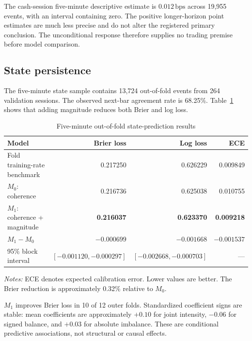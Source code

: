 \documentclass[11pt]{article}
\newcommand{\Mzero}{M_{0}}
\newcommand{\Mone}{M_{1}}
\newcommand{\bps}{\mathrm{bps}}
\begin{document}
The cash-session five-minute descriptive estimate is $0.012\,\bps$ across 19,955 events,
with an interval containing zero. The positive longer-horizon point estimates are much
less precise and do not alter the registered primary conclusion. The unconditional
response therefore supplies no trading premise before model comparison.

\subsection{State persistence}

The five-minute state sample contains 13,724 out-of-fold events from 264 validation
sessions. The observed next-bar agreement rate is 68.25\%. Table~\ref{tab:state-results}
shows that adding magnitude reduces both Brier and log loss.

\begin{table}[!htbp]
  \centering
  \caption{Five-minute out-of-fold state-prediction results}
  \label{tab:state-results}
  \small
  \begin{tabular}{lrrr}
    \toprule
    Model & Brier loss & Log loss & ECE \\
    \midrule
    Fold training-rate benchmark & 0.217250 & 0.626229 & 0.009849 \\
    $\Mzero$: coherence & 0.216736 & 0.625038 & 0.010755 \\
    $\Mone$: coherence + magnitude & \textbf{0.216037} & \textbf{0.623370} & \textbf{0.009218} \\
    \midrule
    $\Mone-\Mzero$ & $-0.000699$ & $-0.001668$ & $-0.001537$ \\
    95\% block interval & $[-0.001120,-0.000297]$ & $[-0.002668,-0.000703]$ & --- \\
    \bottomrule
  \end{tabular}
  \par\vspace{2pt}
  \parbox{0.88\textwidth}{\footnotesize\textit{Notes:} ECE denotes expected calibration
  error. Lower values are better. The Brier reduction is approximately 0.32\% relative
  to $\Mzero$.}
\end{table}

$\Mone$ improves Brier loss in 10 of 12 outer folds. Standardized coefficient signs are
stable: mean coefficients are approximately $+0.10$ for joint intensity, $-0.06$ for
signed balance, and $+0.03$ for absolute imbalance. These are conditional predictive
associations, not structural or causal effects.
\end{document}
